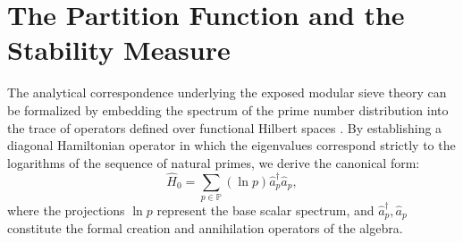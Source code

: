 \documentclass{article}
\numberwithin{equation}{section}
\theoremstyle{plain}
\theoremstyle{definition}
\begin{document}
\begin{table}[h!]
\centering
\renewcommand{\arraystretch}{1.5}
\caption{Asymptotic evolution of the Gaussian primorial sequence. Level 2 ($\Pi_2$) stands out analytically as the optimal steady-state attractor that maximizes the filtering ratio against the combinatorial divergence of the class group.}
\label{tabla:primoriales_gauss}
\end{table}

\section{The Partition Function and the Stability Measure}
\label{apendice:hamiltoniano_primones}

The analytical correspondence underlying the exposed modular sieve theory can be formalized by embedding the spectrum of the prime number distribution into the trace of operators defined over functional Hilbert spaces \cite{Julia1990}. By establishing a diagonal Hamiltonian operator in which the eigenvalues correspond strictly to the logarithms of the sequence of natural primes, we derive the canonical form:
\begin{equation}
    \hat{H}_0 = \sum_{p \in \mathbb{P}} (\ln p) \hat{a}_p^\dagger \hat{a}_p,
\end{equation}
where the projections $\ln p$ represent the base scalar spectrum, and $\hat{a}_p^\dagger, \hat{a}_p$ constitute the formal creation and annihilation operators of the algebra.
\end{document}
